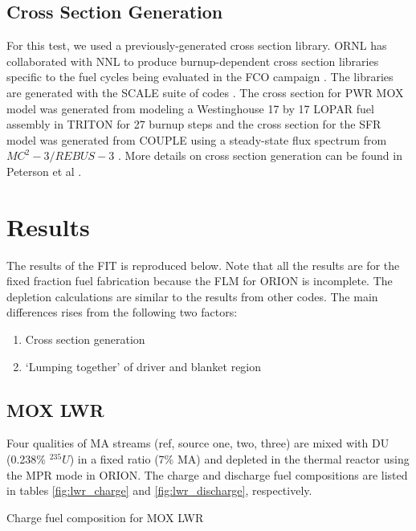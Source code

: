 \documentclass{article}
\begin{document}
\subsection{Cross Section Generation}
For this test, we used a previously-generated cross section library.
\gls{ORNL} has collaborated with \gls{NNL} to produce burnup-dependent cross section libraries specific to the fuel
cycles being evaluated in the FCO campaign \cite{wigeland_nuclear_2014}. The libraries are generated with the
SCALE suite of codes \cite{noauthor_scale_nodate}. The cross section for \gls{PWR} \gls{MOX} model was generated from modeling
a Westinghouse 17 by 17 LOPAR fuel assembly in TRITON for 27 burnup steps and the cross section for the \gls{SFR}
model was generated from COUPLE using a steady-state flux spectrum from $MC^2-3 / REBUS-3$ \cite{lee_mc2-3:_2013}.
More details on cross section generation can be found in Peterson et al \cite{peterson_generating_2016}.


\section{Results}
The results of the \gls{FIT} is reproduced below. Note that all the results are for the fixed fraction
fuel fabrication because the \gls{FLM} for ORION is incomplete. The depletion calculations are similar to the
results from other codes. The main differences rises from the following two factors:

\begin{enumerate}
    \item Cross section generation
    \item `Lumping together' of driver and blanket region
\end{enumerate}

\subsection{\gls{MOX} \gls{LWR}}
Four qualities of \gls{MA} streams (ref, source one, two, three) are mixed with 
\gls{DU} (0.238\% $^{235}U$) in a fixed ratio (7\% \gls{MA}) and depleted in the thermal reactor
using the MPR mode in ORION. The charge and discharge fuel compositions are listed in
tables \ref{fig:lwr_charge} and \ref{fig:lwr_discharge}, respectively.

\begin{table}[h]
    \centering
    
    \caption{Charge fuel composition for \gls{MOX} \gls{LWR}}
    \label{fig:lwr_charge}
\end{table}
\end{document}
